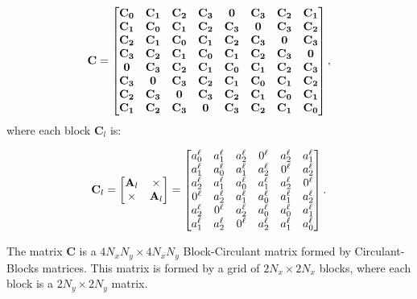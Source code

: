 \documentclass[manuscript,revised]{geophysics}
\begin{document}
\begin{equation}
\tensor{C} =
\begin{bmatrix}
	\tensor{C_{0}} & \tensor{C_{1}} & \tensor{C_{2}} & \tensor{C_{3}} & \tensor{0} & \tensor{C_{3}} & \tensor{C_{2}} & \tensor{C_{1}} \cr
	\tensor{C_{1}} & \tensor{C_{0}} & \tensor{C_{1}} & \tensor{C_{2}} & \tensor{C_{3}} & \tensor{0} & \tensor{C_{3}} & \tensor{C_{2}} \cr
	\tensor{C_{2}} & \tensor{C_{1}} & \tensor{C_{0}} & \tensor{C_{1}} & \tensor{C_{2}} & \tensor{C_{3}} & \tensor{0} & \tensor{C_{3}} \cr
	\tensor{C_{3}} & \tensor{C_{2}} & \tensor{C_{1}} & \tensor{C_{0}} & \tensor{C_{1}} & \tensor{C_{2}} & \tensor{C_{3}} & \tensor{0} \cr
	\tensor{0} & \tensor{C_{3}} & \tensor{C_{2}} & \tensor{C_{1}} & \tensor{C_{0}} & \tensor{C_{1}} & \tensor{C_{2}} & \tensor{C_{3}} \cr
	\tensor{C_{3}} & \tensor{0} & \tensor{C_{3}} & \tensor{C_{2}} & \tensor{C_{1}} & \tensor{C_{0}} & \tensor{C_{1}} & \tensor{C_{2}} \cr
	\tensor{C_{2}} & \tensor{C_{3}} & \tensor{0} & \tensor{C_{3}} & \tensor{C_{2}} & \tensor{C_{1}} & \tensor{C_{0}} & \tensor{C_{1}} \cr
	\tensor{C_{1}} & \tensor{C_{2}} & \tensor{C_{3}} & \tensor{0} & \tensor{C_{3}} & \tensor{C_{2}} & \tensor{C_{1}} & \tensor{C_{0}}
\end{bmatrix},
\label{eq:circulant_elements}
\end{equation}
where each block $\mathbf{C}_{l}$ is:

\begin{equation}
\tensor{C}_{l} =
\begin{bmatrix}
	\tensor{A}_{l} & \times \cr
	\times & \tensor{A}_{l}
\end{bmatrix} =
\begin{bmatrix}
	a_{0}^{\ell} & a_{1}^{\ell} & a_{2}^{\ell} & 0^{\ell} & a_{2}^{\ell} & a_{1}^{\ell} \cr
	a_{1}^{\ell} & a_{0}^{\ell} & a_{1}^{\ell} & a_{2}^{\ell} & 0^{\ell} & a_{2}^{\ell} \cr
	a_{2}^{\ell} & a_{1}^{\ell} & a_{0}^{\ell} & a_{1}^{\ell} & a_{2}^{\ell} & 0^{\ell} \cr
	0^{\ell} & a_{2}^{\ell} & a_{1}^{\ell} & a_{0}^{\ell} & a_{1}^{\ell} & a_{2}^{\ell} \cr
	a_{2}^{\ell} & 0^{\ell} & a_{2}^{\ell} & a_{0}^{\ell} & a_{0}^{\ell} & a_{1}^{\ell} \cr
	a_{1}^{\ell} & a_{2}^{\ell} & 0^{\ell} & a_{2}^{\ell} & a_{1}^{\ell} & a_{0}^{\ell}
\end{bmatrix}.
\label{eq:toeplitz_circulant_element}
\end{equation}

The matrix $\mathbf{C}$ is a $4N_x N_y \times 4N_x N_y$ Block-Circulant matrix formed by Circulant-Blocks matrices. This matrix is formed by a grid of $2N_x \times 2N_x$ blocks, where each block is a $2N_y \times 2N_y$ matrix.
\end{document}
